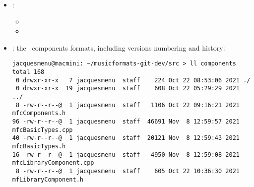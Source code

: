\begin{itemize}
\begin{itemize}
  \item {}
  \item {}
  \item {}
  \item {}\\[-0.5ex]
  \end{itemize}

\item {} :

\begin{itemize}
  \item {}
  \item {}
  \end{itemize}

\item {} : the \mf\ components formats, including versions numbering and history:
\begin{lstlisting}[language=Terminal]
jacquesmenu@macmini: ~/musicformats-git-dev/src > ll components
total 168
 0 drwxr-xr-x   7 jacquesmenu  staff    224 Oct 22 08:53:06 2021 ./
 0 drwxr-xr-x  19 jacquesmenu  staff    608 Oct 22 05:29:29 2021 ../
 8 -rw-r--r--@  1 jacquesmenu  staff   1106 Oct 22 09:16:21 2021 mfcComponents.h
96 -rw-r--r--@  1 jacquesmenu  staff  46691 Nov  8 12:59:57 2021 mfcBasicTypes.cpp
40 -rw-r--r--@  1 jacquesmenu  staff  20121 Nov  8 12:59:43 2021 mfcBasicTypes.h
16 -rw-r--r--@  1 jacquesmenu  staff   4950 Nov  8 12:59:08 2021 mfcLibraryComponent.cpp
 8 -rw-r--r--@  1 jacquesmenu  staff    605 Oct 22 10:36:30 2021 mfLibraryComponent.h
\end{lstlisting}


\end{itemize}
